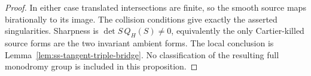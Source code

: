 \begin{proof}
In either case translated intersections are finite, so the smooth
source maps birationally to its image. The collision conditions
give exactly the asserted singularities. Sharpness is
$\det S\,Q_H(S)\ne0$, equivalently the only Cartier-killed source
forms are the two invariant ambient forms. The local conclusion
is Lemma~\ref{lem:ss-tangent-triple-bridge}. No classification of
the resulting full monodromy group is included in this proposition.
\end{proof}
